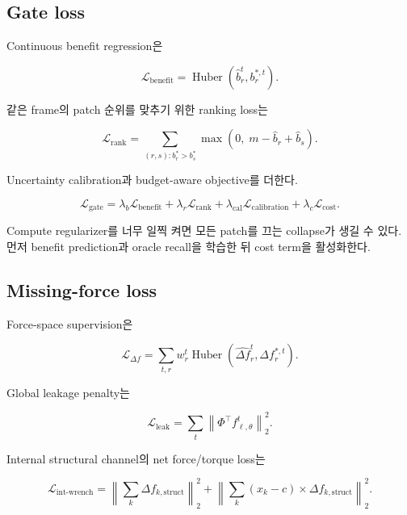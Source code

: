 \documentclass[11pt,a4paper]{article}
\begin{document}
\subsection{Gate loss}

Continuous benefit regression은

\begin{equation}
  \mathcal L_{\mathrm{benefit}}
  =
  \operatorname{Huber}
  (\widehat b_r^t,b_r^{*,t}).
\end{equation}

같은 frame의 patch 순위를 맞추기 위한 ranking loss는

\begin{equation}
  \mathcal L_{\mathrm{rank}}
  =
  \sum_{(r,s):b_r^*>b_s^*}
  \max
  \left(
    0,\;
    m-\widehat b_r+\widehat b_s
  \right).
\end{equation}

Uncertainty calibration과 budget-aware objective를 더한다.

\begin{equation}
  \mathcal L_{\mathrm{gate}}
  =
  \lambda_b\mathcal L_{\mathrm{benefit}}
  +\lambda_r\mathcal L_{\mathrm{rank}}
  +\lambda_{\mathrm{cal}}\mathcal L_{\mathrm{calibration}}
  +\lambda_c\mathcal L_{\mathrm{cost}}.
\end{equation}

Compute regularizer를 너무 일찍 켜면 모든 patch를 끄는 collapse가 생길 수 있다.
먼저 benefit prediction과 oracle recall을 학습한 뒤 cost term을 활성화한다.

\subsection{Missing-force loss}

Force-space supervision은

\begin{equation}
  \mathcal L_{\Delta f}
  =
  \sum_{t,r}
  w_r^t
  \operatorname{Huber}
  \left(
    \widehat{\Delta f}_r^t,
    \Delta f_r^{*,t}
  \right).
\end{equation}

Global leakage penalty는

\begin{equation}
  \mathcal L_{\mathrm{leak}}
  =
  \sum_t
  \left\|
  \Phi^\top f_{\ell,\theta}^t
  \right\|_2^2.
\end{equation}

Internal structural channel의 net force/torque loss는

\begin{equation}
  \mathcal L_{\mathrm{int\mbox{-}wrench}}
  =
  \left\|
  \sum_k\Delta f_{k,\mathrm{struct}}
  \right\|_2^2
  +
  \left\|
  \sum_k(x_k-c)\times\Delta f_{k,\mathrm{struct}}
  \right\|_2^2.
\end{equation}
\end{document}

